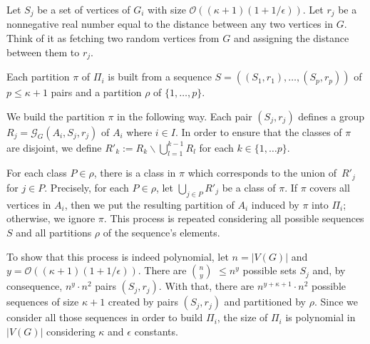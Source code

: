 Let \(S_j\) be a set of vertices of \(G_i\) with size \(\mathcal{O}((\kappa + 1)(1 + 1/\epsilon))\). Let \(r_j\) be a nonnegative real number equal to the distance between any two vertices in \(G\). Think of it as fetching two random vertices from \(G\) and assigning the distance between them to \(r_j\).

Each partition \(\pi\) of \(\Pi_i\) is built from a sequence \(S = ((S_1, r_1), \dots, (S_p, r_p))\) of \(p \le \kappa + 1\) pairs and a partition \(\rho\) of \(\{1, \dots, p\}\).

We build the partition \(\pi\) in the following way. Each pair \((S_j, r_j)\) defines a group \(R_j = \mathcal{G}_G(A_i, S_j, r_j)\) of \(A_i\) where \(i\in I\). In order to ensure that the classes of \(\pi\) are disjoint, we define \(R'_k := R_k \backslash \bigcup^{k-1}_{l=1} R_l\) for each $k \in \{1, \ldots p\}$.

For each class \(P \in \rho\), there is a class in \(\pi\) which corresponds to the union of~\(R'_j\) for \(j \in P\). Precisely, for each \(P \in \rho\),  let \(\bigcup_{j \in P} R'_j\) be a class of \(\pi\). If \(\pi\) covers all vertices in \(A_i\), then we put the resulting partition of \(A_i\) induced by \(\pi\) into \(\Pi_i\); otherwise, we ignore \(\pi\). This process is repeated considering all possible sequences \(S\) and all partitions \(\rho\) of the sequence's elements.

To show that this process is indeed polynomial, let \(n = |V(G)|\) and \(y = \mathcal{O}((\kappa + 1)(1 + 1/\epsilon))\). There are \(n \choose y \) \(\leq n^y\) possible sets \(S_j\) and, by consequence, \(n^y \cdot n^2\) pairs \((S_j, r_j)\). With that, there are \(n^{y + \kappa + 1} \cdot n^2\) possible sequences of size \(\kappa + 1\) created by pairs \((S_j, r_j)\) and partitioned by \(\rho\). Since we consider all those sequences in order to build \(\Pi_i\), the size of \(\Pi_i\) is polynomial in \(|V(G)|\) considering \(\kappa\) and \(\epsilon\) constants.

